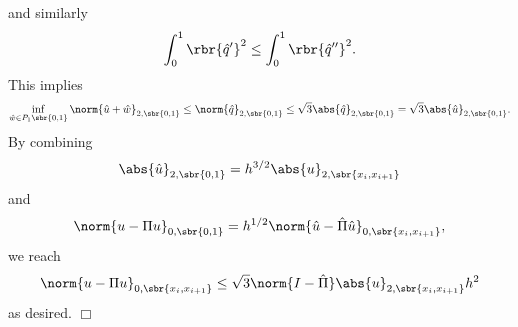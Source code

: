 \documentclass[english, nochinese]{pnote}
\begin{document}
and similarly
\begin{equation}
\int_0^1 \rbr{\hat{q}'}^2 \le \int_0^1 \rbr{\hat{q}''}^2.
\end{equation}
This implies
\begin{equation}
\inf_{ \hat{w} \in P_1 \sbr{ 0, 1 } } \norm{ \hat{u} + \hat{w} }_{ 2, \sbr{ 0, 1 } } \le \norm{\hat{q}}_{ 2, \sbr{ 0, 1 } } \le \sqrt{3} \abs{\hat{q}}_{ 2, \sbr{ 0, 1 } } = \sqrt{3} \abs{\hat{u}}_{ 2, \sbr{ 0, 1 } }.
\end{equation}
By combining
\begin{equation}
\abs{\hat{u}}_{ 2, \sbr{ 0, 1 } } = h^{ 3 / 2 } \abs{u}_{ 2, \sbr{ x_i, x_{ i + 1 } } }
\end{equation}
and
\begin{equation}
\norm{ u - \Pi u }_{ 0, \sbr{ 0, 1 } } = h^{ 1 / 2 } \norm{ \hat{u} - \hat{\Pi} \hat{u} }_{ 0, \sbr{ x_i, x_{ i + 1 } } },
\end{equation}
we reach
\begin{equation}
\norm{ u - \Pi u }_{ 0, \sbr{ x_i, x_{ i  + 1 } } } \le \sqrt{3} \norm{ I - \hat{\Pi} } \abs{u}_{ 2, \sbr{ x_i, x_{ i + 1 } } } h^2
\end{equation}
as desired.
\hfill$\Box$
\end{document}
